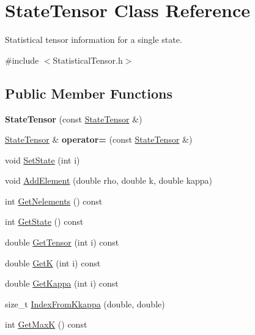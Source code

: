 \hypertarget{classStateTensor}{\section{State\-Tensor Class Reference}
\label{classStateTensor}
}


Statistical tensor information for a single state.  




{\ttfamily \#include $<$Statistical\-Tensor.\-h$>$}

\subsection*{Public Member Functions}
\begin{DoxyCompactItemize}
\item 
\hypertarget{classStateTensor_a978a4161e37553ad42e30989d7c35f5f}{{\bfseries State\-Tensor} (const \hyperlink{classStateTensor}{State\-Tensor} \&)}\label{classStateTensor_a978a4161e37553ad42e30989d7c35f5f}

\item 
\hypertarget{classStateTensor_a8efc4683d973be8f92a30301679bd7d8}{\hyperlink{classStateTensor}{State\-Tensor} \& {\bfseries operator=} (const \hyperlink{classStateTensor}{State\-Tensor} \&)}\label{classStateTensor_a8efc4683d973be8f92a30301679bd7d8}

\item 
void \hyperlink{classStateTensor_a969a220f6a5be9b01afa78b6292e01d7}{Set\-State} (int i)
\item 
void \hyperlink{classStateTensor_a830dc885eb4aa28cd39c144f07c2ec06}{Add\-Element} (double rho, double k, double kappa)
\item 
int \hyperlink{classStateTensor_ad297f8b055e24255c184e1aa3cba9813}{Get\-Nelements} () const 
\item 
int \hyperlink{classStateTensor_a007e86a82445e082bc1b183805990039}{Get\-State} () const 
\item 
double \hyperlink{classStateTensor_a5e6589749f471fab682594e8df6c7da7}{Get\-Tensor} (int i) const 
\item 
double \hyperlink{classStateTensor_adbef5f333e1f020354f400c6e70c510f}{Get\-K} (int i) const 
\item 
double \hyperlink{classStateTensor_a596ba29aacb7231b5d9cef84071115de}{Get\-Kappa} (int i) const 
\item 
size\-\_\-t \hyperlink{classStateTensor_a10cd06b8aadf80ee0041f198bf1bbde4}{Index\-From\-Kkappa} (double, double)
\item 
int \hyperlink{classStateTensor_ad3f5e96da9cfc45470d6dde9594d46dc}{Get\-Max\-K} () const 
\end{DoxyCompactItemize}


